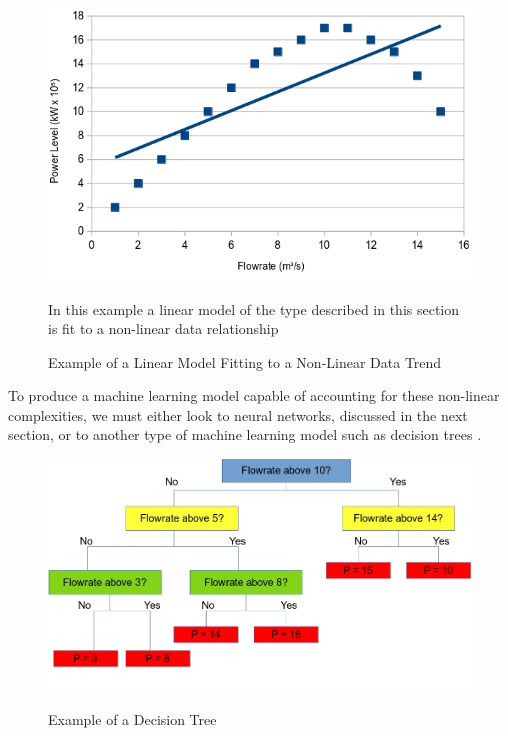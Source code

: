 \begin{figure}[h]
	\centering
	\includegraphics[scale=0.45]{Figures/LinearFit.jpg}
	\caption{Example of a Linear Model Fitting to a Non-Linear Data Trend} {In this example a linear model of the type described in this section is fit to a non-linear data relationship}
	\label{fig:linearFit}
\end{figure}

 
 To produce a machine learning model capable of accounting for these non-linear complexities, we must either look to neural networks, discussed in the next section, or to another type of machine learning model such as decision trees \cite{de2013decision}. 
 
 \begin{figure}[h]
 	\centering
 	\includegraphics[scale=0.4]{Figures/DecisionTree.jpg}
 	\caption{Example of a Decision Tree} {}
 	\label{fig:DecisionTree}
 \end{figure}

